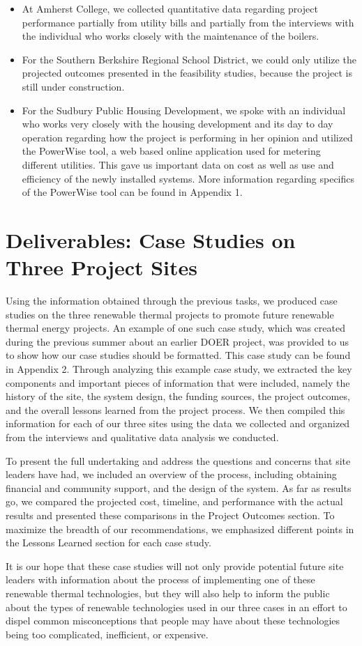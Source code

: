    \begin{itemize}
      \item{At Amherst College, we collected quantitative data regarding project performance partially from utility bills and partially from the interviews with the individual who works closely with the maintenance of the boilers.}
      \item{For the Southern Berkshire Regional School District, we could only utilize the projected outcomes presented in the feasibility studies, because the project is still under construction.}
      \item{For the Sudbury Public Housing Development, we spoke with an individual who works very closely with the housing development and its day to day operation regarding how the project is performing in her opinion and utilized the PowerWise tool, a web based online application used for metering different utilities. This gave us important data on cost as well as use and efficiency of the newly installed systems. More information regarding specifics of the PowerWise tool can be found in Appendix 1.}
    \end{itemize}

  \section{Deliverables: Case Studies on Three Project Sites}
  \par Using the information obtained through the previous tasks, we produced case studies on the three renewable thermal projects to promote future renewable thermal energy projects. An example of one such case study, which was created during the previous summer about an earlier DOER project, was provided to us to show how our case studies should be formatted. This case study can be found in Appendix 2. Through analyzing this example case study, we extracted the key components and important pieces of information that were included, namely the history of the site, the system design, the funding sources, the project outcomes, and the overall lessons learned from the project process. We then compiled this information for each of our three sites using the data we collected and organized from the interviews and qualitative data analysis we conducted.
  \par To present the full undertaking and address the questions and concerns that site leaders have had, we included an overview of the process, including obtaining financial and community support, and the design of the system. As far as results go, we compared the projected cost, timeline, and performance with the actual results and presented these comparisons in the Project Outcomes section. To maximize the breadth of our recommendations, we emphasized different points in the Lessons Learned section for each case study.
  \par It is our hope that these case studies will not only provide potential future site leaders with information about the process of implementing one of these renewable thermal technologies, but they will also help to inform the public about the types of renewable technologies used in our three cases in an effort to dispel common misconceptions that people may have about these technologies being too complicated, inefficient, or expensive. 
